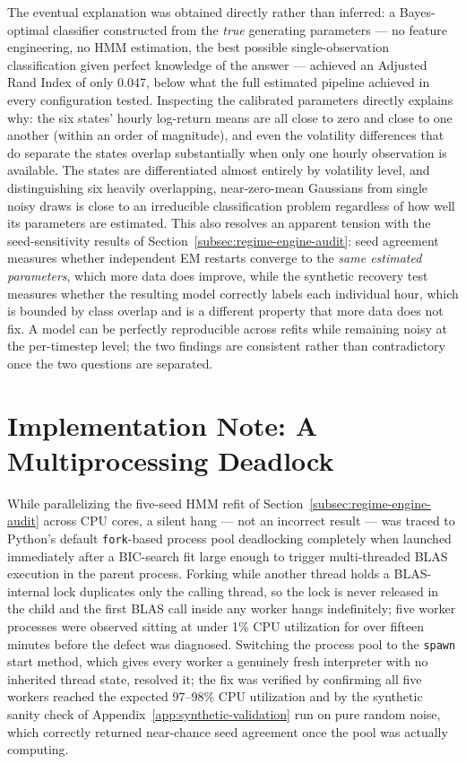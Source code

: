 The eventual explanation was obtained directly rather than inferred: a Bayes-optimal classifier constructed from the \emph{true} generating parameters --- no feature engineering, no HMM estimation, the best possible single-observation classification given perfect knowledge of the answer --- achieved an Adjusted Rand Index of only 0.047, below what the full estimated pipeline achieved in every configuration tested. Inspecting the calibrated parameters directly explains why: the six states' hourly log-return means are all close to zero and close to one another (within an order of magnitude), and even the volatility differences that do separate the states overlap substantially when only one hourly observation is available. The states are differentiated almost entirely by volatility level, and distinguishing six heavily overlapping, near-zero-mean Gaussians from single noisy draws is close to an irreducible classification problem regardless of how well its parameters are estimated. This also resolves an apparent tension with the seed-sensitivity results of Section~\ref{subsec:regime-engine-audit}: seed agreement measures whether independent EM restarts converge to the \emph{same estimated parameters}, which more data does improve, while the synthetic recovery test measures whether the resulting model correctly labels each individual hour, which is bounded by class overlap and is a different property that more data does not fix. A model can be perfectly reproducible across refits while remaining noisy at the per-timestep level; the two findings are consistent rather than contradictory once the two questions are separated.

\section{Implementation Note: A Multiprocessing Deadlock}
\label{app:blas-deadlock}

While parallelizing the five-seed HMM refit of Section~\ref{subsec:regime-engine-audit} across CPU cores, a silent hang --- not an incorrect result --- was traced to Python's default \texttt{fork}-based process pool deadlocking completely when launched immediately after a BIC-search fit large enough to trigger multi-threaded BLAS execution in the parent process. Forking while another thread holds a BLAS-internal lock duplicates only the calling thread, so the lock is never released in the child and the first BLAS call inside any worker hangs indefinitely; five worker processes were observed sitting at under 1\% CPU utilization for over fifteen minutes before the defect was diagnosed. Switching the process pool to the \texttt{spawn} start method, which gives every worker a genuinely fresh interpreter with no inherited thread state, resolved it; the fix was verified by confirming all five workers reached the expected 97--98\% CPU utilization and by the synthetic sanity check of Appendix~\ref{app:synthetic-validation} run on pure random noise, which correctly returned near-chance seed agreement once the pool was actually computing.
